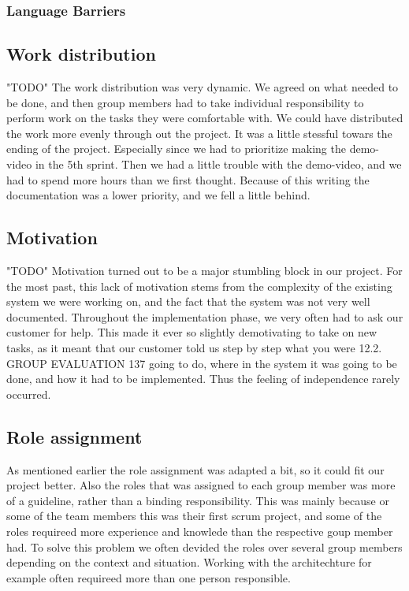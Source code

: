\subsubsection{Language Barriers}


\subsection{Work distribution}
"TODO"
The work distribution was very dynamic. We agreed on what needed to be done, and then group members had to take individual responsibility to perform work on the tasks they were comfortable with.
We could have distributed the work more evenly through out the project. 
It was a little stessful towars the ending of the project. Especially since we had to prioritize making the demo-video in the 5th sprint. Then we had a little trouble with the demo-video, and we had to spend more hours than we first thought. Because of this writing the documentation was a lower priority, and we fell a little behind.  
  
\subsection{Motivation}
"TODO"
Motivation turned out to be a major stumbling block in our project. For the
most past, this lack of motivation stems from the complexity of the existing
system we were working on, and the fact that the system was not very well
documented. Throughout the implementation phase, we very often had to ask
our customer for help. This made it ever so slightly demotivating to take on
new tasks, as it meant that our customer told us step by step what you were
12.2. GROUP EVALUATION 137
going to do, where in the system it was going to be done, and how it had to be
implemented. Thus the feeling of independence rarely occurred.

\subsection{Role assignment}
As mentioned earlier the role assignment was adapted a bit, so it could fit our project better. Also the roles that was assigned to each group member was more of a guideline, rather than a binding responsibility. This was mainly because or some of the team members this was their first scrum project, and some of the roles requireed more experience and knowlede than the respective goup member had. To solve this problem we often devided the roles over several group members depending on the context and situation. Working with the architechture for example often requireed more than one person responsible. 

